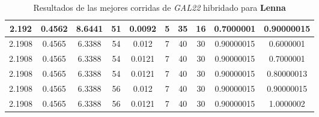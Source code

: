 \begin{table}[h!]
\begin{center}
\begin{tabular}{|c|c|c|c|c|c|c|c|c|c|}
        \hline
        \hline
            2.192 & 0.4562  & 8.6441 & 51 & 0.0092 & 5 & 35 & 16 & 0.7000001 & 0.90000015\\
        \hline
        \hline
            2.1908 & 0.4565  & 6.3388 & 54 & 0.012 & 7 & 40 & 30 & 0.90000015 & 0.6000001\\
        \hline
        \hline
            2.1908 & 0.4565  & 6.3388 & 54 & 0.0121 & 7 & 40 & 30 & 0.90000015 & 0.7000001\\
        \hline
        \hline
            2.1908 & 0.4565  & 6.3388 & 54 & 0.0121 & 7 & 40 & 30 & 0.90000015 & 0.80000013\\
        \hline
        \hline
            2.1908 & 0.4565  & 6.3388 & 56 & 0.012 & 7 & 40 & 30 & 0.90000015 & 0.90000015\\
        \hline
        \hline
            2.1908 & 0.4565  & 6.3388 & 56 & 0.0121 & 7 & 40 & 30 & 0.90000015 & 1.0000002\\
        \hline
        \end{tabular}
        \caption{Resultados de las mejores corridas de \emph{GAL22} hibridado para {\bf Lenna}}
        \label{tb:tableGAL22}
    \end{center}
\end{table}
